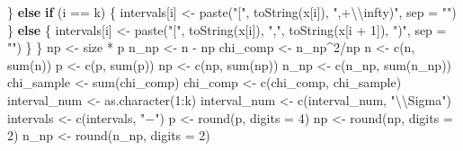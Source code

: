 \documentclass[
]{article}
\newenvironment{Shaded}{\begin{snugshade}}{\end{snugshade}}
\newcommand{\AttributeTok}[1]{\textcolor[rgb]{0.77,0.63,0.00}{#1}}
\newcommand{\ControlFlowTok}[1]{\textcolor[rgb]{0.13,0.29,0.53}{\textbf{#1}}}
\newcommand{\DecValTok}[1]{\textcolor[rgb]{0.00,0.00,0.81}{#1}}
\newcommand{\FunctionTok}[1]{\textcolor[rgb]{0.00,0.00,0.00}{#1}}
\newcommand{\NormalTok}[1]{#1}
\newcommand{\OtherTok}[1]{\textcolor[rgb]{0.56,0.35,0.01}{#1}}
\newcommand{\SpecialCharTok}[1]{\textcolor[rgb]{0.00,0.00,0.00}{#1}}
\newcommand{\StringTok}[1]{\textcolor[rgb]{0.31,0.60,0.02}{#1}}
\begin{document}
\begin{Shaded}
\begin{Highlighting}[]
\NormalTok{    \} }\ControlFlowTok{else} \ControlFlowTok{if}\NormalTok{ (i }\SpecialCharTok{==}\NormalTok{ k) \{}
\NormalTok{        intervals[i] }\OtherTok{\textless{}{-}} \FunctionTok{paste}\NormalTok{(}\StringTok{"["}\NormalTok{, }\FunctionTok{toString}\NormalTok{(x[i]), }\StringTok{",+}\SpecialCharTok{\textbackslash{}\textbackslash{}}\StringTok{infty)"}\NormalTok{, }\AttributeTok{sep =} \StringTok{""}\NormalTok{)}
\NormalTok{    \} }\ControlFlowTok{else}\NormalTok{ \{}
\NormalTok{        intervals[i] }\OtherTok{\textless{}{-}} \FunctionTok{paste}\NormalTok{(}\StringTok{"["}\NormalTok{, }\FunctionTok{toString}\NormalTok{(x[i]), }\StringTok{","}\NormalTok{, }\FunctionTok{toString}\NormalTok{(x[i }\SpecialCharTok{+} \DecValTok{1}\NormalTok{]), }\StringTok{")"}\NormalTok{, }
            \AttributeTok{sep =} \StringTok{""}\NormalTok{)}
\NormalTok{    \}}
\NormalTok{\}}
\NormalTok{np }\OtherTok{\textless{}{-}}\NormalTok{ size }\SpecialCharTok{*}\NormalTok{ p}
\NormalTok{n\_np }\OtherTok{\textless{}{-}}\NormalTok{ n }\SpecialCharTok{{-}}\NormalTok{ np}
\NormalTok{chi\_comp }\OtherTok{\textless{}{-}}\NormalTok{ n\_np}\SpecialCharTok{\^{}}\DecValTok{2}\SpecialCharTok{/}\NormalTok{np}
\NormalTok{n }\OtherTok{\textless{}{-}} \FunctionTok{c}\NormalTok{(n, }\FunctionTok{sum}\NormalTok{(n))}
\NormalTok{p }\OtherTok{\textless{}{-}} \FunctionTok{c}\NormalTok{(p, }\FunctionTok{sum}\NormalTok{(p))}
\NormalTok{np }\OtherTok{\textless{}{-}} \FunctionTok{c}\NormalTok{(np, }\FunctionTok{sum}\NormalTok{(np))}
\NormalTok{n\_np }\OtherTok{\textless{}{-}} \FunctionTok{c}\NormalTok{(n\_np, }\FunctionTok{sum}\NormalTok{(n\_np))}
\NormalTok{chi\_sample }\OtherTok{\textless{}{-}} \FunctionTok{sum}\NormalTok{(chi\_comp)}
\NormalTok{chi\_comp }\OtherTok{\textless{}{-}} \FunctionTok{c}\NormalTok{(chi\_comp, chi\_sample)}
\NormalTok{interval\_num }\OtherTok{\textless{}{-}} \FunctionTok{as.character}\NormalTok{(}\DecValTok{1}\SpecialCharTok{:}\NormalTok{k)}
\NormalTok{interval\_num }\OtherTok{\textless{}{-}} \FunctionTok{c}\NormalTok{(interval\_num, }\StringTok{"}\SpecialCharTok{\textbackslash{}\textbackslash{}}\StringTok{Sigma"}\NormalTok{)}
\NormalTok{intervals }\OtherTok{\textless{}{-}} \FunctionTok{c}\NormalTok{(intervals, }\StringTok{"${-}$"}\NormalTok{)}
\NormalTok{p }\OtherTok{\textless{}{-}} \FunctionTok{round}\NormalTok{(p, }\AttributeTok{digits =} \DecValTok{4}\NormalTok{)}
\NormalTok{np }\OtherTok{\textless{}{-}} \FunctionTok{round}\NormalTok{(np, }\AttributeTok{digits =} \DecValTok{2}\NormalTok{)}
\NormalTok{n\_np }\OtherTok{\textless{}{-}} \FunctionTok{round}\NormalTok{(n\_np, }\AttributeTok{digits =} \DecValTok{2}\NormalTok{)}

\end{Highlighting}
\end{Shaded}
\end{document}
